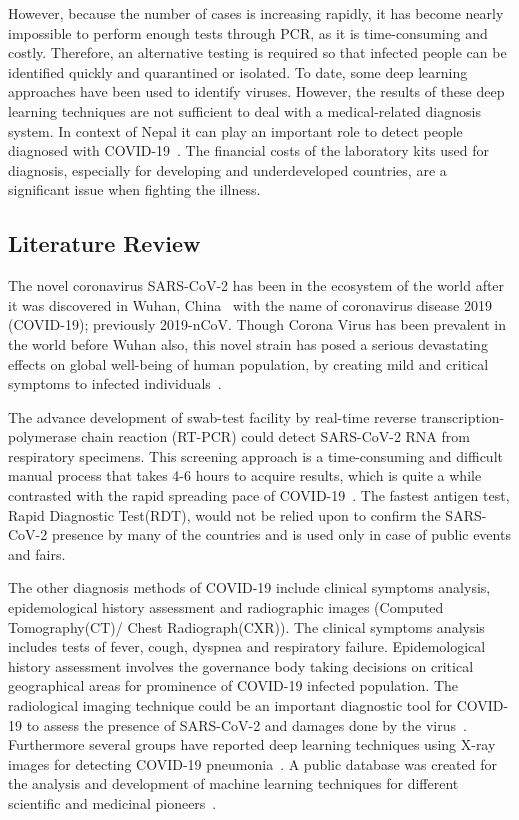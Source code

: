 However, because the number of cases is increasing rapidly, it has become nearly impossible to perform enough tests through PCR, as it is time-consuming and costly. Therefore, an alternative testing is required so that infected people can be identified quickly and quarantined or isolated. To date, some deep learning approaches have been used to identify viruses. However, the results of these deep learning techniques are not sufficient to deal with a medical-related diagnosis system. In context of Nepal it can play an important role to detect people diagnosed with COVID-19~\cite{Rubin2020}. The financial costs of the laboratory kits used for diagnosis, especially for developing and underdeveloped countries, are a significant issue when fighting the illness.

\subsection{Literature Review}
 The novel coronavirus SARS-CoV-2 has been in the ecosystem of the world after it was discovered in Wuhan, China~\cite{Velavan2020} with the name of coronavirus disease 2019 (COVID-19); previously 2019-nCoV. Though Corona Virus has been prevalent in the world before Wuhan also, this novel strain has posed a serious devastating effects on global well-being of human population, by creating mild and critical symptoms to infected individuals~\cite{Tomar2021}.

 The advance development of swab-test facility by real-time reverse transcription-polymerase chain reaction (RT-PCR) could detect SARS-CoV-2 RNA from respiratory specimens. This screening approach is a time-consuming and difficult manual process that takes 4-6 hours to acquire results, which is quite a while contrasted with the rapid spreading pace of COVID-19~\cite{Chaudhary2020}. The fastest antigen test, Rapid Diagnostic Test(RDT), would not be relied upon to confirm the SARS-CoV-2 presence by many of the countries and is used only in case of public events and fairs.

 The other diagnosis methods of COVID-19 include clinical symptoms analysis, epidemological history assessment and radiographic images (Computed Tomography(CT)/ Chest Radiograph(CXR)). The clinical symptoms analysis includes tests of fever, cough, dyspnea and respiratory failure. Epidemological history assessment involves the governance body taking decisions on critical geographical areas for prominence of COVID-19 infected population. The radiological imaging technique could be an important diagnostic tool for COVID-19 to assess the presence of SARS-CoV-2 and damages done by the virus~\cite{Chaudhary2020}. Furthermore several groups have reported deep learning techniques using X-ray images for detecting COVID-19 pneumonia~\cite{bbb632134fb693b2dc6bd3b7123c82f0a141e0a0}. A public database was created for the analysis and development of machine learning techniques for different scientific and medicinal pioneers~\cite{wang2020cord}.

